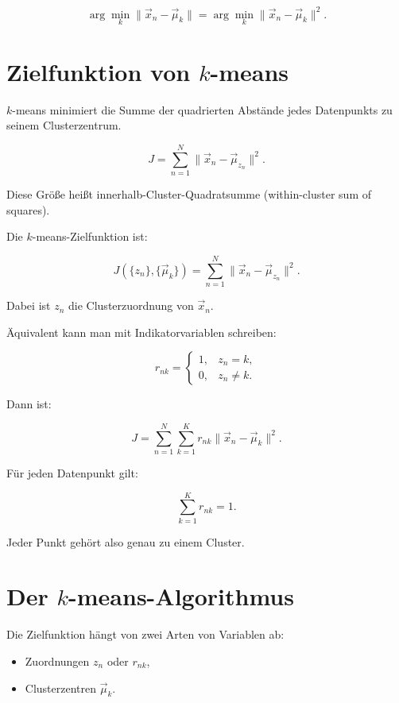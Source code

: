 \[
    \arg\min_k
    \|\vec{x}_n-\vec{\mu}_k\|
    =
    \arg\min_k
    \|\vec{x}_n-\vec{\mu}_k\|^2.
\]

\section{Zielfunktion von \(k\)-means}

\(k\)-means minimiert die Summe der quadrierten Abstände jedes Datenpunkts zu seinem Clusterzentrum.

\[
    J
    =
    \sum_{n=1}^{N}
    \|\vec{x}_n-\vec{\mu}_{z_n}\|^2.
\]

Diese Größe heißt innerhalb-Cluster-Quadratsumme (within-cluster sum of squares).

\begin{definitionbox}
Die \(k\)-means-Zielfunktion ist:

\[
    J(\{z_n\},\{\vec{\mu}_k\})
    =
    \sum_{n=1}^{N}
    \|\vec{x}_n-\vec{\mu}_{z_n}\|^2.
\]

Dabei ist \(z_n\) die Clusterzuordnung von \(\vec{x}_n\).
\end{definitionbox}

Äquivalent kann man mit Indikatorvariablen schreiben:

\[
    r_{nk}
    =
    \begin{cases}
        1, & z_n=k, \\
        0, & z_n\neq k.
    \end{cases}
\]

Dann ist:

\[
    J
    =
    \sum_{n=1}^{N}
    \sum_{k=1}^{K}
    r_{nk}
    \|\vec{x}_n-\vec{\mu}_k\|^2.
\]

\begin{notebox}
Für jeden Datenpunkt gilt:

\[
    \sum_{k=1}^{K} r_{nk}=1.
\]

Jeder Punkt gehört also genau zu einem Cluster.
\end{notebox}

\section{Der \(k\)-means-Algorithmus}

Die Zielfunktion hängt von zwei Arten von Variablen ab:

\begin{itemize}
    \item Zuordnungen \(z_n\) oder \(r_{nk}\),
    \item Clusterzentren \(\vec{\mu}_k\).
\end{itemize}

